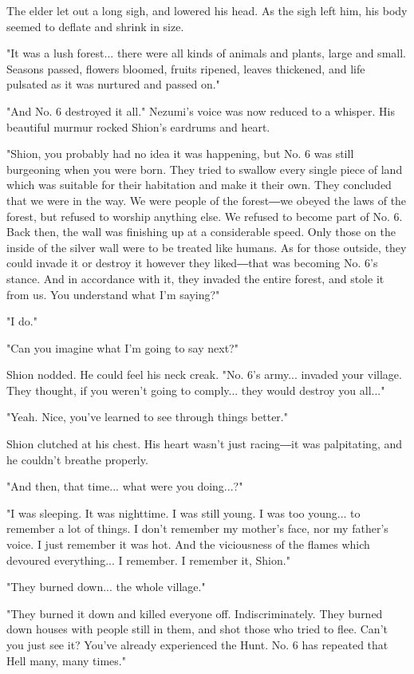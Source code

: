 The elder let out a long sigh, and lowered his head. As the sigh left
him, his body seemed to deflate and shrink in size.

"It was a lush forest... there were all kinds of animals and plants,
large and small. Seasons passed, flowers bloomed, fruits ripened, leaves
thickened, and life pulsated as it was nurtured and passed on."

"And No. 6 destroyed it all." Nezumi's voice was now reduced to a
whisper. His beautiful murmur rocked Shion's eardrums and heart.

"Shion, you probably had no idea it was happening, but No. 6 was still
burgeoning when you were born. They tried to swallow every single piece
of land which was suitable for their habitation and make it their own.
They concluded that we were in the way. We were people of the forest―we
obeyed the laws of the forest, but refused to worship anything else. We
refused to become part of No. 6. Back then, the wall was finishing up at
a considerable speed. Only those on the inside of the silver wall were
to be treated like humans. As for those outside, they could invade it or
destroy it however they liked―that was becoming No. 6's stance. And in
accordance with it, they invaded the entire forest, and stole it from
us. You understand what I'm saying?"

"I do."

"Can you imagine what I'm going to say next?"

Shion nodded. He could feel his neck creak. "No. 6's army... invaded
your village. They thought, if you weren't going to comply... they would
destroy you all..."

"Yeah. Nice, you've learned to see through things better."

Shion clutched at his chest. His heart wasn't just racing―it was
palpitating, and he couldn't breathe properly.

"And then, that time... what were you doing...?"

"I was sleeping. It was nighttime. I was still young. I was too young...
to remember a lot of things. I don't remember my mother's face, nor my
father's voice. I just remember it was hot. And the viciousness of the
flames which devoured everything... I remember. I remember it, Shion."

"They burned down... the whole village."

"They burned it down and killed everyone off. Indiscriminately. They
burned down houses with people still in them, and shot those who tried
to flee. Can't you just see it? You've already experienced the Hunt. No.
6 has repeated that Hell many, many times."

